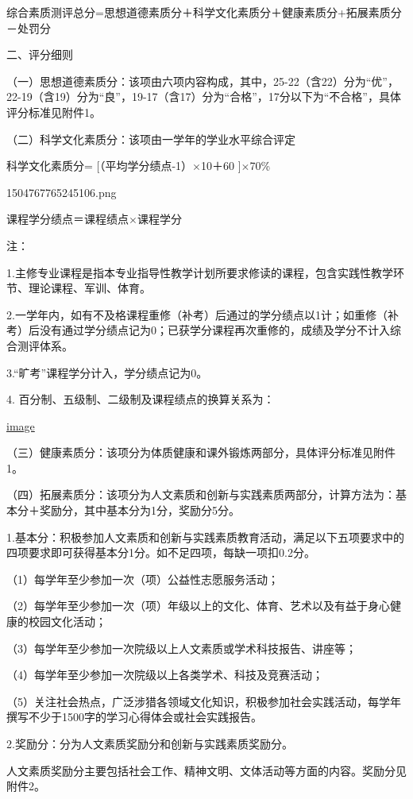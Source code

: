 \documentclass[UTF8,12pt,a4paper]{report}
\begin{document}
综合素质测评总分=思想道德素质分＋科学文化素质分＋健康素质分+拓展素质分－处罚分

二、评分细则

（一）思想道德素质分：该项由六项内容构成，其中，25-22（含22）分为“优”，22-19（含19）分为“良”，19-17（含17）分为“合格”，17分以下为“不合格”，具体评分标准见附件1。

（二）科学文化素质分：该项由一学年的学业水平综合评定

科学文化素质分= [（平均学分绩点-1）$\times$10＋60 ]$\times$70\%

1504767765245106.png

课程学分绩点＝课程绩点$\times$课程学分

注：

1.主修专业课程是指本专业指导性教学计划所要求修读的课程，包含实践性教学环节、理论课程、军训、体育。

2.一学年内，如有不及格课程重修（补考）后通过的学分绩点以1计；如重修（补考）后没有通过学分绩点记为0；已获学分课程再次重修的，成绩及学分不计入综合测评体系。

3.“旷考”课程学分计入，学分绩点记为0。

4. 百分制、五级制、二级制及课程绩点的换算关系为：

\href{http://img01.fs.yiban.cn/out/thumb_550x0/aHR0cDovL3lmczAxLmZzLnlpYmFuLmNuL3dlYi83NTg4OTE0L3VwbG9hZC8xNTA0NzY5Mjc4NTE2NTc3LnBuZw==}{image}

（三）健康素质分：该项分为体质健康和课外锻炼两部分，具体评分标准见附件1。

（四）拓展素质分：该项分为人文素质和创新与实践素质两部分，计算方法为：基本分＋奖励分，其中基本分为1分，奖励分5分。

1.基本分：积极参加人文素质和创新与实践素质教育活动，满足以下五项要求中的四项要求即可获得基本分1分。如不足四项，每缺一项扣0.2分。

（1）每学年至少参加一次（项）公益性志愿服务活动；

（2）每学年至少参加一次（项）年级以上的文化、体育、艺术以及有益于身心健康的校园文化活动；

（3）每学年至少参加一次院级以上人文素质或学术科技报告、讲座等；

（4）每学年至少参加一次院级以上各类学术、科技及竞赛活动；

（5）关注社会热点，广泛涉猎各领域文化知识，积极参加社会实践活动，每学年撰写不少于1500字的学习心得体会或社会实践报告。

2.奖励分：分为人文素质奖励分和创新与实践素质奖励分。

人文素质奖励分主要包括社会工作、精神文明、文体活动等方面的内容。奖励分见附件2。
\end{document}
